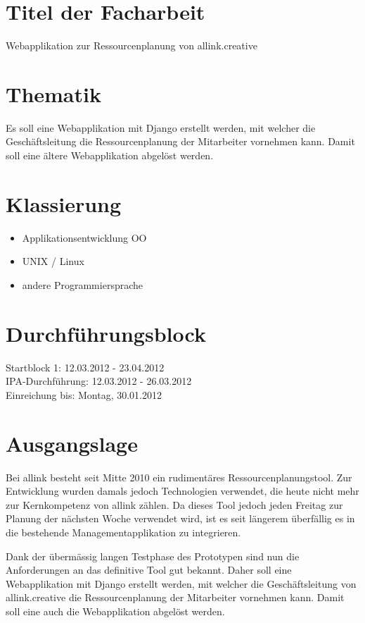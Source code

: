 \section{Titel der Facharbeit} 
Webapplikation zur Ressourcenplanung von allink.creative
    
\section{Thematik}
Es soll eine Webapplikation mit Django erstellt werden, mit welcher die Geschäftsleitung die Ressourcenplanung der Mitarbeiter vornehmen kann. 
Damit soll eine ältere Webapplikation abgelöst werden.
\section{Klassierung}
    
\begin{itemize}
    \item Applikationsentwicklung OO
    \item UNIX / Linux
    \item andere Programmiersprache
\end{itemize}
    
\section{Durchführungsblock}
Startblock 1: 12.03.2012 - 23.04.2012\\
IPA-Durchführung: 12.03.2012 - 26.03.2012\\
Einreichung bis: Montag, 30.01.2012\\
    
\section{Ausgangslage}
Bei allink besteht seit Mitte 2010 ein rudimentäres Ressourcenplanungstool. Zur Entwicklung wurden damals jedoch Technologien verwendet, die heute nicht mehr zur Kernkompetenz von allink zählen. Da dieses Tool jedoch jeden Freitag zur Planung der nächsten Woche verwendet wird, ist es seit längerem überfällig es in die bestehende Managementapplikation zu integrieren.

Dank der übermässig langen Testphase des Prototypen sind nun die Anforderungen an das definitive Tool gut bekannt. Daher soll eine Webapplikation mit Django erstellt werden, mit welcher die Geschäftsleitung von allink.creative die Ressourcenplanung der Mitarbeiter vornehmen kann. Damit soll eine auch die Webapplikation abgelöst werden.
    
